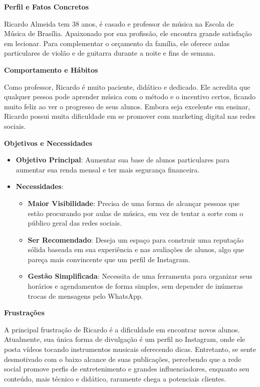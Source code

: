 \begin{apendicesenv}
\textbf{Perfil e Fatos Concretos}

Ricardo Almeida tem 38 anos, é casado e professor de música na Escola de Música de Brasília. Apaixonado por sua profissão, ele encontra grande satisfação em lecionar. Para complementar o orçamento da família,  ele oferece aulas particulares de violão e de guitarra durante a noite e fins de semana.

\textbf{Comportamento e Hábitos}

Como professor, Ricardo é muito paciente, didático e dedicado. Ele acredita que qualquer pessoa pode aprender música com o método e o incentivo certos, ficando muito feliz ao ver o progresso de seus alunos. Embora seja excelente em ensinar, Ricardo possui muita dificuldade em se promover com marketing digital nas redes sociais.

\textbf{Objetivos e Necessidades}

\begin{itemize}
\item \textbf{Objetivo Principal}: Aumentar sua base de alunos particulares para aumentar sua renda mensal e ter mais segurança financeira.

\item \textbf{Necessidades}:

\begin{itemize}

\item \textbf{Maior Visibilidade}: Precisa de uma forma de alcançar pessoas que estão procurando por aulas de música, em vez de tentar a sorte com o público geral das redes sociais.

\item \textbf{Ser Recomendado}: Deseja um espaço para construir uma reputação sólida baseada em sua experiência e nas avaliações de alunos, algo que pareça mais convincente que um perfil de Instagram.

\item \textbf{Gestão Simplificada}: Necessita de uma ferramenta para organizar seus horários e agendamentos de forma simples, sem depender de inúmeras trocas de mensagens pelo WhatsApp.

\end{itemize}

\end{itemize}

\textbf{Frustrações}

A principal frustração de Ricardo é a dificuldade em encontrar novos alunos. Atualmente, sua única forma de divulgação é um perfil no Instagram, onde ele posta vídeos tocando instrumentos musicais oferecendo dicas. Entretanto, se sente desmotivado com o baixo alcance de suas publicações, percebendo que a rede social promove perfis de entretenimento e grandes influenciadores, enquanto seu conteúdo, mais técnico e didático, raramente chega a potenciais clientes.


\end{apendicesenv}
